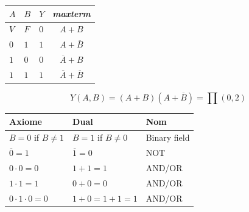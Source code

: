 \documentclass{report}
\begin{document}
\begin{multicols*}{3}
                \begin{table}[H]
                  \begin{center}
                   \renewcommand{\arraystretch}{1.5}
                     \footnotesize
                        \begin{tabular}{|l|l|l||c|}
                        \arrayrulecolor{blue}\hline
                        \rowcolor{lightBlue}
                        \textcolor{myb}{$A$} & \textcolor{myb}{$B$} 
                                           & \textcolor{myb}{$Y$} 
                                           & \textcolor{myb}{\textit{maxterm}}  
                        \\
                        \hline
                        \hline
                        \arrayrulecolor{black}
                        $V$ & $F$ & \cellcolor{myg} $0$ & \textcolor{myg}{$A + B$}
                        \\
                        \hline
                        $0$ & $1$ & \cellcolor{myr} $1$ & $A + \overline{B}$
                        \\
                        \hline 
                        $1$ & $0$ & \cellcolor{myg} $0$ & \textcolor{myg}{$\overline{A} + B$} 
                        \\ 
                        \hline
                        $1$ & $1$ & \cellcolor{myr} $1$ & $\overline{A} + \overline{B}$ 
                        \\
                        \hline
                        \end{tabular}
                \end{center}
                \end{table}
                \[Y(A, B) = (A+B)(A + \overline{B}) = \prod (0, 2) \]



    \begin{table}[H]
      \centering
      \renewcommand{\arraystretch}{1.5}
      \setlength{\arrayrulewidth}{0.4pt}
      \footnotesize
      \begin{tabular}{|l|l|l|}
        \hline
        \rowcolor{lightBlue}
        \textcolor{myb}{Axiome} & \textcolor{myb}{Dual} & \textcolor{myb}{Nom} \\
        \hline
        \hline
        \( B = 0 \) if \( B \neq 1 \) & \( B = 1 \) if \( B \neq 0 \) & Binary field \\
        \rowcolor{lightBlue}
        \( \overline{0} = 1 \) & \( \overline{1} = 0 \) & NOT \\
        \( 0 \cdot 0 = 0 \) & \( 1 + 1 = 1 \) & AND/OR \\
        \rowcolor{lightBlue}
        \( 1 \cdot 1 = 1 \) & \( 0 + 0 = 0 \) & AND/OR \\
        \( 0 \cdot 1 \cdot 0 = 0 \) & \( 1 + 0 = 1 + 1 = 1 \) & AND/OR \\
        \hline
        \end{tabular}
    \end{table}




\end{multicols*}
\end{document}
